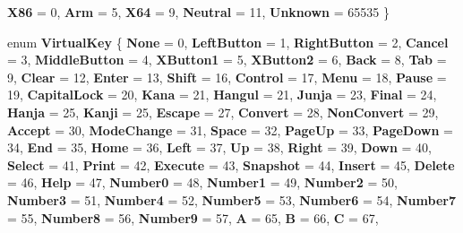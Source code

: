 \begin{DoxyCompactItemize}
\newline
{\bfseries X86} = 0, 
{\bfseries Arm} = 5, 
{\bfseries X64} = 9, 
{\bfseries Neutral} = 11, 
\newline
{\bfseries Unknown} = 65535
 \}
\item 
\mbox{\label{namespace_windows_1_1_system_a1a8cbbb9416665bdd61b8c82d489c265}} 
enum {\bfseries Virtual\+Key} \{ \newline
{\bfseries None} = 0, 
{\bfseries Left\+Button} = 1, 
{\bfseries Right\+Button} = 2, 
{\bfseries Cancel} = 3, 
\newline
{\bfseries Middle\+Button} = 4, 
{\bfseries X\+Button1} = 5, 
{\bfseries X\+Button2} = 6, 
{\bfseries Back} = 8, 
\newline
{\bfseries Tab} = 9, 
{\bfseries Clear} = 12, 
{\bfseries Enter} = 13, 
{\bfseries Shift} = 16, 
\newline
{\bfseries Control} = 17, 
{\bfseries Menu} = 18, 
{\bfseries Pause} = 19, 
{\bfseries Capital\+Lock} = 20, 
\newline
{\bfseries Kana} = 21, 
{\bfseries Hangul} = 21, 
{\bfseries Junja} = 23, 
{\bfseries Final} = 24, 
\newline
{\bfseries Hanja} = 25, 
{\bfseries Kanji} = 25, 
{\bfseries Escape} = 27, 
{\bfseries Convert} = 28, 
\newline
{\bfseries Non\+Convert} = 29, 
{\bfseries Accept} = 30, 
{\bfseries Mode\+Change} = 31, 
{\bfseries Space} = 32, 
\newline
{\bfseries Page\+Up} = 33, 
{\bfseries Page\+Down} = 34, 
{\bfseries End} = 35, 
{\bfseries Home} = 36, 
\newline
{\bfseries Left} = 37, 
{\bfseries Up} = 38, 
{\bfseries Right} = 39, 
{\bfseries Down} = 40, 
\newline
{\bfseries Select} = 41, 
{\bfseries Print} = 42, 
{\bfseries Execute} = 43, 
{\bfseries Snapshot} = 44, 
\newline
{\bfseries Insert} = 45, 
{\bfseries Delete} = 46, 
{\bfseries Help} = 47, 
{\bfseries Number0} = 48, 
\newline
{\bfseries Number1} = 49, 
{\bfseries Number2} = 50, 
{\bfseries Number3} = 51, 
{\bfseries Number4} = 52, 
\newline
{\bfseries Number5} = 53, 
{\bfseries Number6} = 54, 
{\bfseries Number7} = 55, 
{\bfseries Number8} = 56, 
\newline
{\bfseries Number9} = 57, 
{\bfseries A} = 65, 
{\bfseries B} = 66, 
{\bfseries C} = 67, 

\end{DoxyCompactItemize}
